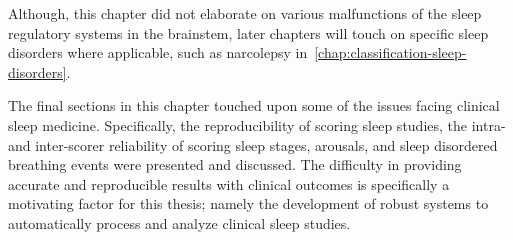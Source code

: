     Although, this chapter did not elaborate on various malfunctions of the sleep regulatory systems in the brainstem, later chapters will touch on specific sleep disorders where applicable, such as narcolepsy in~\cref{chap:classification-sleep-disorders}.
    
    The final sections in this chapter touched upon some of the issues facing clinical sleep medicine.
    Specifically, the reproducibility of scoring sleep studies, the intra- and inter-scorer reliability of scoring sleep stages, arousals, and sleep disordered breathing events were presented and discussed.
    The difficulty in providing accurate and reproducible results with clinical outcomes is specifically a motivating factor for this thesis; namely the development of robust systems to automatically process and analyze clinical sleep studies.
    